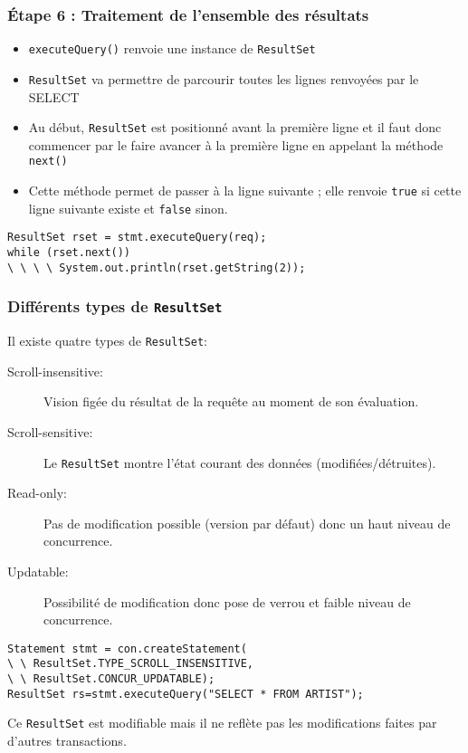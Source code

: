 \documentclass[xcolor=pdftex,x11names,table]{beamer}
\begin{document}
    \begin{frame}
    \frametitle{Étape 6 : Traitement de l’ensemble des résultats}
    	\begin{itemize}
    		\item \lstinline$executeQuery()$ renvoie une instance de	\lstinline$ResultSet$
    		\item \lstinline$ResultSet$ va permettre de parcourir toutes les lignes renvoyées par le SELECT
    		\item Au début, \lstinline$ResultSet$ est positionné avant la première ligne et il faut donc commencer par le faire avancer 
    		à la première ligne en appelant la méthode \lstinline$next()$
    		\item Cette méthode permet de passer à la ligne suivante ; elle renvoie \lstinline$true$ si cette ligne suivante existe et \lstinline$false$ sinon.
			\end{itemize}
			\begin{block}{}
				\lstinline$ResultSet rset = stmt.executeQuery(req);$\\
				\lstinline$while (rset.next())$\\
				\lstinline$\ \ \ \ System.out.println(rset.getString(2));$\\
      \end{block}
    \end{frame}
    
    \begin{frame}
    \frametitle{Différents types de \lstinline$ResultSet$}
      Il existe quatre types de \lstinline$ResultSet$:
    	\begin{description}
    		\item[Scroll-insensitive:] Vision figée du résultat de la requête au moment de son évaluation.
        \item[Scroll-sensitive:] Le \lstinline$ResultSet$ montre l'état courant des données (modifiées/détruites).
        \item[Read-only:] Pas de modification possible (version par défaut) donc un haut niveau de concurrence.
        \item[Updatable:] Possibilité de modification donc pose de verrou et faible niveau de concurrence.
			\end{description}
			\begin{block}{}
        \lstinline$Statement stmt = con.createStatement( $\\
        \lstinline$\ \ ResultSet.TYPE_SCROLL_INSENSITIVE, $\\
        \lstinline$\ \ ResultSet.CONCUR_UPDATABLE); $\\
        \lstinline$ResultSet rs=stmt.executeQuery("SELECT * FROM ARTIST");$\\
      \end{block}
      Ce \lstinline$ResultSet$ est modifiable mais il ne reflète pas les modifications faites par d'autres transactions.
    \end{frame}
     
\end{document}
